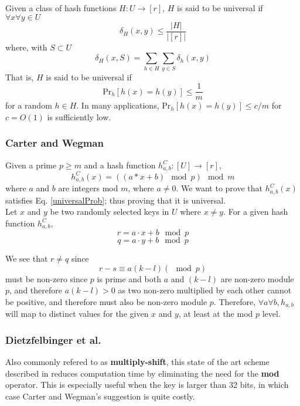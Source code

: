 \documentclass[../../main.tex]{subfiles}
\begin{document}
Given a class of hash functions $H:U\rightarrow [r]$, $H$ is said to be universal if $\forall x \forall y \in U$
$$
	\delta_H (x,y) \leq \frac{|H|}{|[r]|}
$$
where, with $S\subset U$
$$
\delta_H (x,S) = \sum_{h\in H}\sum_{y\in S} \delta_h(x,y)
$$
That is, $H$ is said to be universal if 
\begin{equation}\label{universalProb}
\mathrm{Pr}_h[h(x)=h(y)]\leq \frac{1}{m}
\end{equation}
for a random $h \in H$.
In many applications, Pr$_h[h(x)=h(y)]\leq c/m$ for $c=O(1)$ is sufficiently low.

\subsubsection{Carter and Wegman\cite{carterWegman}}
Given a prime $p\geq m$ and a hash function $h_{a,b}^C:[U]\rightarrow [r]$,
\begin{equation}\label{carterhash}
h_{a,b}^{C}(x)=((a*x + b) \mod p) \mod m
\end{equation}
where $a$ and $b$ are integers mod $m$, where $a\neq 0$. We want to prove that $h_{a,b}^{C}(x)$ satisfies Eq. \ref{universalProb}; thus proving that it is universal.\\

\noindent Let $x$ and $y$ be two randomly selected keys in $U$ where $x\neq y$. For a given hash function $h_{a,b}^{C}$,
$$
r = a\cdot x + b \mod p
$$
$$
q = a \cdot y + b \mod p
$$

\noindent We see that $r\neq q$ since 
$$
r - s \equiv a(k-l) ( \mod p)
$$
must be non-zero since $p$ is prime and both $a$ and $(k-l)$ are non-zero module $p$, and therefore $a(k-l) > 0$ as two non-zero multiplied by each other cannot be positive, and therefore must also be non-zero module $p$.
Therefore, $\forall a\forall b, h_{a,b}$ will map to distinct values for the given $x$ and $y$, at least at the mod $p$ level.

\subsubsection{Dietzfelbinger et al.\cite{Dietzfelbinger}}
Also commonly refered to as \textbf{multiply-shift}, this state of the art scheme described in \cite{Dietzfelbinger} reduces computation time by eliminating the need for the \textbf{mod} operator. This is especially useful when the key is larger than 32 bits, in which case Carter and Wegman's suggestion is quite costly\cite{dikuHash}.\\
\end{document}

